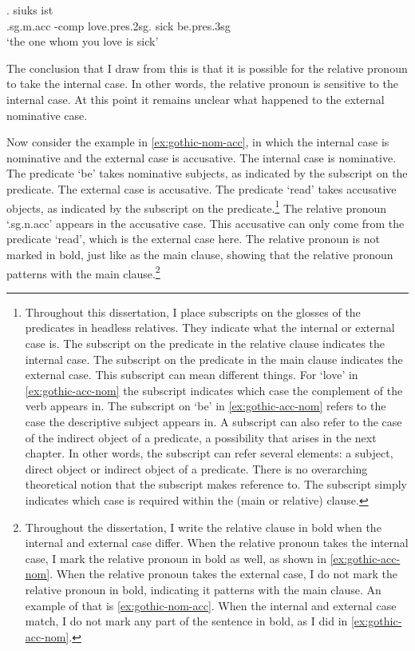 \exg.    siuks ist\\
 .\ac{sg}.\ac{m}.\ac{acc} -\ac{comp} love.\ac{pres}.2\ac{sg}.\scsub{[acc]} sick be.\ac{pres}.3\ac{sg}\scsub{[nom]}\\
 `the one whom you love is sick' \label{ex:gothic-acc-nom}

The conclusion that I draw from this is that it is possible for the relative pronoun to take the internal case. In other words, the relative pronoun is sensitive to the internal case.
At this point it remains unclear what happened to the external nominative case.

Now consider the example in \ref{ex:gothic-nom-acc}, in which the internal case is nominative and the external case is accusative.
The internal case is nominative. The predicate  `be' takes nominative subjects, as indicated by the subscript on the predicate.
The external case is accusative. The predicate  `read' takes accusative objects, as indicated by the subscript on the predicate.\footnote{
Throughout this dissertation, I place subscripts on the glosses of the predicates in headless relatives. They indicate what the internal or external case is. The subscript on the predicate in the relative clause indicates the internal case. The subscript on the predicate in the main clause indicates the external case. This subscript can mean different things.
For  `love' in \ref{ex:gothic-acc-nom} the subscript indicates which case the complement of the verb appears in. The subscript on  `be' in \ref{ex:gothic-acc-nom} refers to the case the descriptive subject appears in. A subscript can also refer to the case of the indirect object of a predicate, a possibility that arises in the next chapter.
In other words, the subscript can refer several elements: a subject, direct object or indirect object of a predicate. There is no overarching theoretical notion that the subscript makes reference to. The subscript simply indicates which case is required within the (main or relative) clause.
}
The relative pronoun  `.\ac{sg}.\ac{n}.\ac{acc}' appears in the accusative case. This accusative can only come from the predicate  `read', which is the external case here. The relative pronoun is not marked in bold, just like as the main clause, showing that the relative pronoun patterns with the main clause.\footnote{
Throughout the dissertation, I write the relative clause in bold when the internal and external case differ. When the relative pronoun takes the internal case, I mark the relative pronoun in bold as well, as shown in \ref{ex:gothic-acc-nom}. When the relative pronoun takes the external case, I do not mark the relative pronoun in bold, indicating it patterns with the main clause. An example of that is \ref{ex:gothic-nom-acc}. When the internal and external case match, I do not mark any part of the sentence in bold, as I did in \ref{ex:gothic-acc-nom}.
}

